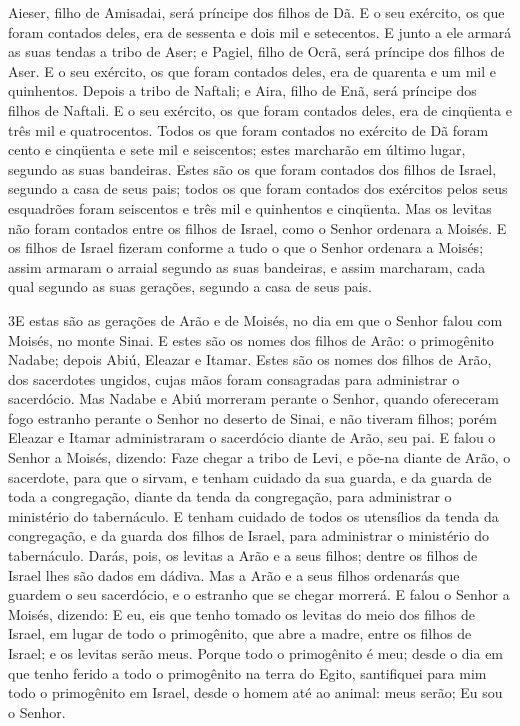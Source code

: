Aieser, filho de Amisadai, será príncipe dos filhos de Dã. E
o seu exército, os que foram contados deles, era de sessenta e dois
mil e setecentos. E junto a ele armará as suas tendas a tribo
de Aser; e Pagiel, filho de Ocrã, será príncipe dos filhos de Aser.
E o seu exército, os que foram contados deles, era de
quarenta e um mil e quinhentos. Depois a tribo de Naftali; e
Aira, filho de Enã, será príncipe dos filhos de Naftali. E o
seu exército, os que foram contados deles, era de cinqüenta e três
mil e quatrocentos. Todos os que foram contados no exército
de Dã foram cento e cinqüenta e sete mil e seiscentos; estes
marcharão em último lugar, segundo as suas bandeiras. Estes
são os que foram contados dos filhos de Israel, segundo a casa de
seus pais; todos os que foram contados dos exércitos pelos seus
esquadrões foram seiscentos e três mil e quinhentos e cinqüenta.
Mas os levitas não foram contados entre os filhos de Israel,
como o Senhor ordenara a Moisés. E os filhos de Israel
fizeram conforme a tudo o que o Senhor ordenara a Moisés; assim
armaram o arraial segundo as suas bandeiras, e assim marcharam, cada
qual segundo as suas gerações, segundo a casa de seus pais.

\medskip

\lettrine{3} E estas são as gerações de Arão e de Moisés, no
dia em que o Senhor falou com Moisés, no monte Sinai. E estes
são os nomes dos filhos de Arão: o primogênito Nadabe; depois Abiú,
Eleazar e Itamar. Estes são os nomes dos filhos de Arão, dos
sacerdotes ungidos, cujas mãos foram consagradas para administrar o
sacerdócio. Mas Nadabe e Abiú morreram perante o Senhor, quando
ofereceram fogo estranho perante o Senhor no deserto de Sinai, e não
tiveram filhos; porém Eleazar e Itamar administraram o sacerdócio
diante de Arão, seu pai. E falou o Senhor a Moisés, dizendo:
Faze chegar a tribo de Levi, e põe-na diante de Arão, o
sacerdote, para que o sirvam, e tenham cuidado da sua guarda, e
da guarda de toda a congregação, diante da tenda da congregação,
para administrar o ministério do tabernáculo. E tenham cuidado
de todos os utensílios da tenda da congregação, e da guarda dos
filhos de Israel, para administrar o ministério do tabernáculo.
Darás, pois, os levitas a Arão e a seus filhos; dentre os filhos
de Israel lhes são dados em dádiva. Mas a Arão e a seus
filhos ordenarás que guardem o seu sacerdócio, e o estranho que se
chegar morrerá. E falou o Senhor a Moisés, dizendo: E
eu, eis que tenho tomado os levitas do meio dos filhos de Israel, em
lugar de todo o primogênito, que abre a madre, entre os filhos de
Israel; e os levitas serão meus. Porque todo o primogênito é
meu; desde o dia em que tenho ferido a todo o primogênito na terra
do Egito, santifiquei para mim todo o primogênito em Israel, desde o
homem até ao animal: meus serão; Eu sou o Senhor.

